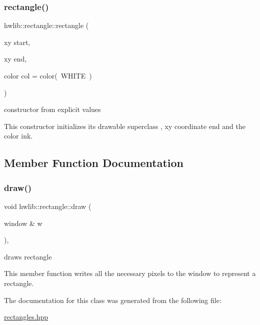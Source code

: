 \subsubsection{\texorpdfstring{rectangle()}{rectangle()}}
{\footnotesize\ttfamily hwlib\+::rectangle\+::rectangle (\begin{DoxyParamCaption}\item[{xy}]{start,  }\item[{xy}]{end,  }\item[{color}]{col = {\ttfamily color(~WHITE~)} }\end{DoxyParamCaption})\hspace{0.3cm}{\ttfamily [inline]}}



constructor from explicit values 

This constructor initializes its drawable superclass , xy coordinate end and the color ink. 

\subsection{Member Function Documentation}
\mbox{\label{classhwlib_1_1rectangle_a5f1ca3bae86e76025891b9402edf6889}} 
\subsubsection{\texorpdfstring{draw()}{draw()}}
{\footnotesize\ttfamily void hwlib\+::rectangle\+::draw (\begin{DoxyParamCaption}\item[{window \&}]{w }\end{DoxyParamCaption})\hspace{0.3cm}{\ttfamily [inline]}, {\ttfamily [override]}}



draws rectangle 

This member function writes all the necessary pixels to the window to represent a rectangle. 

The documentation for this class was generated from the following file\+:\begin{DoxyCompactItemize}
\item 
\hyperlink{rectangles_8hpp}{rectangles.\+hpp}\end{DoxyCompactItemize}
